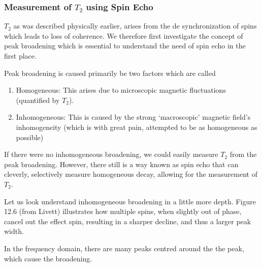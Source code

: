 		\subsubsection{Measurement of $T_2$ using Spin Echo}
			$T_2$ as was described physically earlier, arises from the de synchronization of spins which leads to loss of coherence. We therefore first investigate the concept of peak broadening which is essential to understand the need of spin echo in the first place.

			Peak broadening is caused primarily be two factors which are called
			\begin{enumerate}
				\item Homogeneous: This arises due to microscopic magnetic fluctuations (quantified by $T_2$).
				\item Inhomogeneous: This is caused by the strong `macroscopic' magnetic field's inhomogeneity (which is with great pain, attempted to be as homogeneous as possible)
			\end{enumerate}
			If there were no inhomogeneous broadening, we could easily measure $T_2$ from the peak broadening. However, there still is a way known as spin echo that can cleverly, selectively measure homogeneous decay, allowing for the measurement of $T_2$.


			Let us look understand inhomogeneous broadening in a little more depth. Figure 12.6 (from Livett) illustrates how multiple spins, when slightly out of phase, cancel out the effect spin, resulting in a sharper decline, and thus a larger peak width.

			In the frequency domain, there are many peaks centred around the the peak, which cause the broadening.

